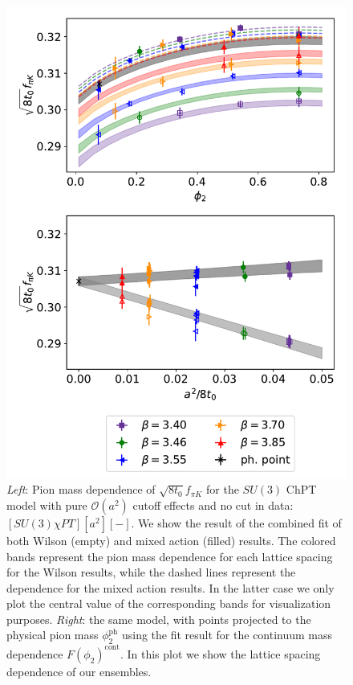 {\begin{figure}
    \centering
    \includegraphics[width=1.\textwidth, angle=0]{./cap5/figs/SU3_comb_aux.pdf}
    \caption{\textit{Left}: Pion mass dependence of $\sqrt{8t_0}f_{\pi K}$ for the $SU(3)$ ChPT model with pure $\mathcal{O}(a^2)$ cutoff effects and no cut in data: $[SU(3)\chi PT][a^2][-]$. We show the result of the combined fit of both Wilson (empty) and mixed action (filled) results. The colored bands represent the pion mass dependence for each lattice spacing for the Wilson results, while the dashed lines represent the dependence for the mixed action results. In the latter case we only plot the central value of the corresponding bands for visualization purposes. \textit{Right}: the same model, with points projected to the physical pion mass $\phi_2^{\textrm{ph}}$ using the fit result for the continuum mass dependence $F(\phi_2)^{\textrm{cont}}$. In this plot we show the lattice spacing dependence of our ensembles.}
    \label{ch_ss:fig:SU3a2}
\end{figure}

}
